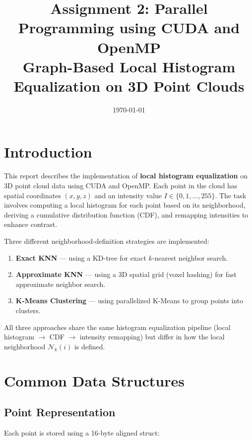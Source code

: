 \documentclass[11pt,a4paper]{article}
\title{
    \textbf{Assignment 2: Parallel Programming using CUDA and OpenMP} \\[0.5em]
    \large Graph-Based Local Histogram Equalization on 3D Point Clouds
}
\author{}
\date{\today}
\begin{document}
\maketitle
\thispagestyle{fancy}

\section{Introduction}

This report describes the implementation of \textbf{local histogram equalization} on 3D point cloud data using CUDA and OpenMP. Each point in the cloud has spatial coordinates $(x, y, z)$ and an intensity value $I \in \{0, 1, \ldots, 255\}$. The task involves computing a local histogram for each point based on its neighborhood, deriving a cumulative distribution function (CDF), and remapping intensities to enhance contrast.

Three different neighborhood-definition strategies are implemented:
\begin{enumerate}
    \item \textbf{Exact KNN} --- using a KD-tree for exact $k$-nearest neighbor search.
    \item \textbf{Approximate KNN} --- using a 3D spatial grid (voxel hashing) for fast approximate neighbor search.
    \item \textbf{K-Means Clustering} --- using parallelized K-Means to group points into clusters.
\end{enumerate}

All three approaches share the same histogram equalization pipeline (local histogram $\to$ CDF $\to$ intensity remapping) but differ in how the local neighborhood $\mathcal{N}_k(i)$ is defined.

\section{Common Data Structures}

\subsection{Point Representation}

Each point is stored using a 16-byte aligned struct:
\end{document}
